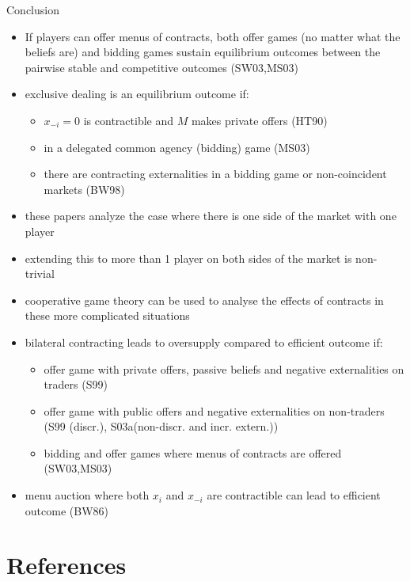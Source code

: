 \documentclass[11pt,english]{beamer}
\begin{document}
\begin{frame}[allowframebreaks]{Conclusion}
  \begin{itemize}
  \item If players can offer menus of contracts, both offer games (no
    matter what the beliefs are) and bidding games sustain equilibrium
    outcomes between the pairwise stable and competitive outcomes (SW03,MS03)
  \item exclusive dealing is an equilibrium outcome if:
    \begin{itemize}
    \item $x_{-i}=0$ is contractible and $M$ makes private offers (HT90)
    \item in a delegated common agency (bidding) game (MS03)
    \item there are contracting externalities in a bidding game or
      non-coincident markets (BW98)
    \end{itemize}
  \item these papers analyze the case where there is one side of the
    market with one player
  \item extending this to more than 1 player on both sides of the
    market is non-trivial
  \item cooperative game theory can be used to analyse the effects of
    contracts in these more complicated situations
  \item bilateral contracting leads to oversupply compared to
    efficient outcome if:
    \begin{itemize}
    \item offer game with private offers, passive beliefs and negative
      externalities on traders (S99)
    \item offer game with public offers and negative externalities on
      non-traders (S99 (discr.), S03a(non-discr. and incr. extern.))
    \item bidding and offer games where menus of contracts are offered
      (SW03,MS03)
    \end{itemize}
  \item menu auction where both $x_i$ and $x_{-i}$ are contractible
    can lead to efficient outcome (BW86)
  \end{itemize}
\end{frame}

\section{References}
\end{document}
